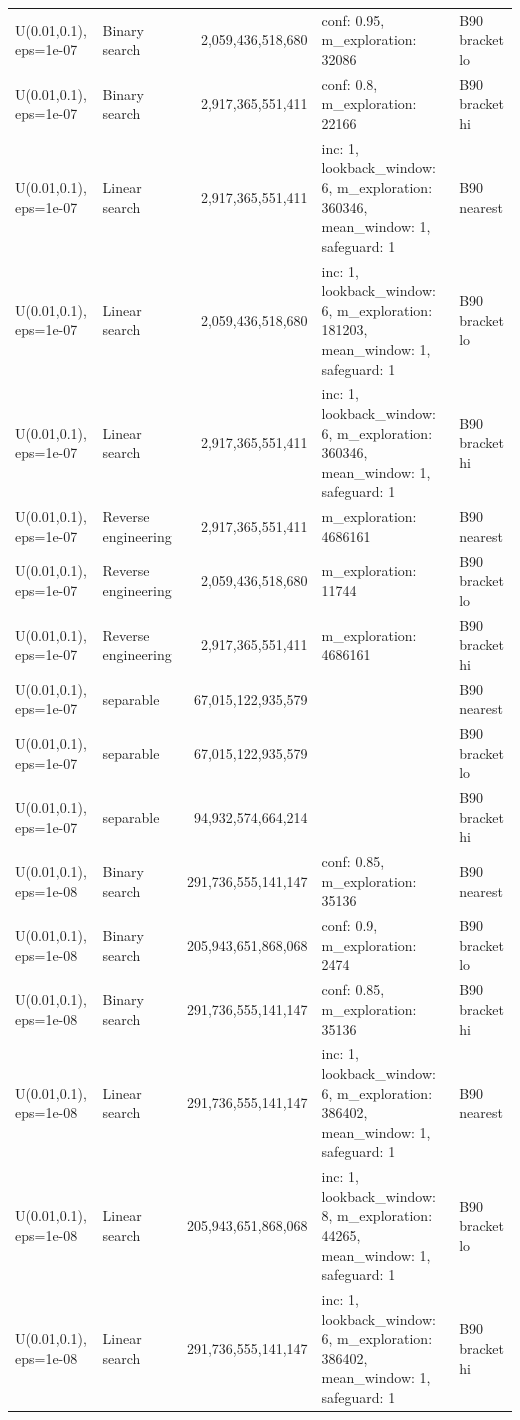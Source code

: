 \begin{tabular}{llrll}
U(0.01,0.1), eps=1e-07 & Binary search & 2,059,436,518,680 & conf: 0.95, m\_exploration: 32086 & B90 bracket lo \\
U(0.01,0.1), eps=1e-07 & Binary search & 2,917,365,551,411 & conf: 0.8, m\_exploration: 22166 & B90 bracket hi \\
U(0.01,0.1), eps=1e-07 & Linear search & 2,917,365,551,411 & inc: 1, lookback\_window: 6, m\_exploration: 360346, mean\_window: 1, safeguard: 1 & B90 nearest \\
U(0.01,0.1), eps=1e-07 & Linear search & 2,059,436,518,680 & inc: 1, lookback\_window: 6, m\_exploration: 181203, mean\_window: 1, safeguard: 1 & B90 bracket lo \\
U(0.01,0.1), eps=1e-07 & Linear search & 2,917,365,551,411 & inc: 1, lookback\_window: 6, m\_exploration: 360346, mean\_window: 1, safeguard: 1 & B90 bracket hi \\
U(0.01,0.1), eps=1e-07 & Reverse engineering & 2,917,365,551,411 & m\_exploration: 4686161 & B90 nearest \\
U(0.01,0.1), eps=1e-07 & Reverse engineering & 2,059,436,518,680 & m\_exploration: 11744 & B90 bracket lo \\
U(0.01,0.1), eps=1e-07 & Reverse engineering & 2,917,365,551,411 & m\_exploration: 4686161 & B90 bracket hi \\
U(0.01,0.1), eps=1e-07 & separable & 67,015,122,935,579 &  & B90 nearest \\
U(0.01,0.1), eps=1e-07 & separable & 67,015,122,935,579 &  & B90 bracket lo \\
U(0.01,0.1), eps=1e-07 & separable & 94,932,574,664,214 &  & B90 bracket hi \\
U(0.01,0.1), eps=1e-08 & Binary search & 291,736,555,141,147 & conf: 0.85, m\_exploration: 35136 & B90 nearest \\
U(0.01,0.1), eps=1e-08 & Binary search & 205,943,651,868,068 & conf: 0.9, m\_exploration: 2474 & B90 bracket lo \\
U(0.01,0.1), eps=1e-08 & Binary search & 291,736,555,141,147 & conf: 0.85, m\_exploration: 35136 & B90 bracket hi \\
U(0.01,0.1), eps=1e-08 & Linear search & 291,736,555,141,147 & inc: 1, lookback\_window: 6, m\_exploration: 386402, mean\_window: 1, safeguard: 1 & B90 nearest \\
U(0.01,0.1), eps=1e-08 & Linear search & 205,943,651,868,068 & inc: 1, lookback\_window: 8, m\_exploration: 44265, mean\_window: 1, safeguard: 1 & B90 bracket lo \\
U(0.01,0.1), eps=1e-08 & Linear search & 291,736,555,141,147 & inc: 1, lookback\_window: 6, m\_exploration: 386402, mean\_window: 1, safeguard: 1 & B90 bracket hi \\

\end{tabular}
